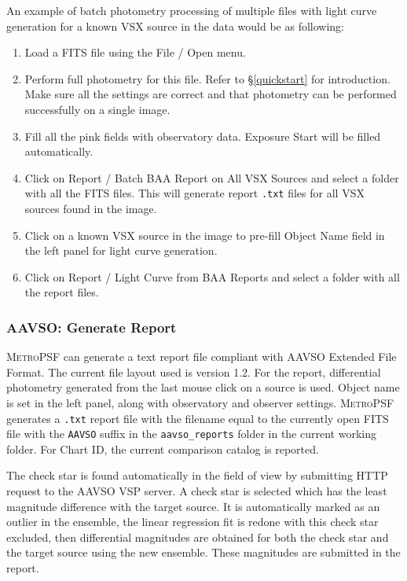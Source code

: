 \documentclass{article}
\begin{document}
An example of batch photometry processing of multiple files with light curve generation for a known VSX source in the data would be as following:
\begin{enumerate}
\item Load a FITS file using the File / Open menu. 
\item Perform full photometry for this file. Refer to \S \ref{quickstart} for introduction. Make sure all the settings are correct and that photometry can be performed successfully on a single image.  
\item Fill all the pink fields with observatory data. Exposure Start will be filled automatically.  
\item Click on Report / Batch BAA Report on All VSX Sources and select a folder with all the FITS files. This will generate report \texttt{.txt} files for all VSX sources found in the image.
\item Click on a known VSX source in the image to pre-fill Object Name field in the left panel for light curve generation.  
\item Click on Report / Light Curve from BAA Reports and select a folder with all the report files.
\end{enumerate}

\subsubsection{AAVSO: Generate Report}
\textsc{MetroPSF} can generate a text report file compliant with AAVSO Extended File Format. The current file layout used is version 1.2. For the report, differential photometry generated from the last mouse click on a source is used. Object name is set in the left panel, along with observatory and observer settings. \textsc{MetroPSF} generates a \texttt{.txt} report file with the filename equal to the currently open FITS file with the \texttt{AAVSO} suffix in the \texttt{aavso\_reports} folder in the current working folder. For Chart ID, the current comparison catalog is reported.

The check star is found automatically in the field of view by submitting HTTP request to the AAVSO VSP server. A check star is selected which has the least magnitude difference with the target source. It is automatically marked as an outlier in the ensemble, the linear regression fit is redone with this check star excluded, then differential magnitudes are obtained for both the check star and the target source using the new ensemble. These magnitudes are submitted in the report.  
\end{document}
